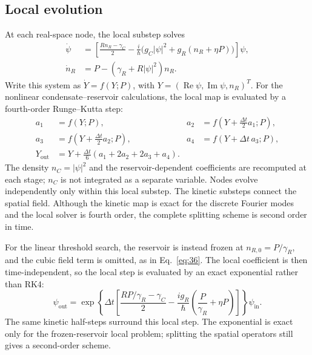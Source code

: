\subsection{Local evolution}\label{sec:B.3}
At each real-space node, the local substep solves
\begin{equation}
\begin{aligned}
\dot\psi&=\left[\frac{Rn_R-\gamma_C}{2}
-\frac{i}{\hbar}\bigl(g_C|\psi|^2+g_R(n_R+\eta P)\bigr)\right]\psi,\\
\dot n_R&=P-(\gamma_R+R|\psi|^2)n_R.
\end{aligned}\label{eq:B.local}
\end{equation}
Write this system as \(\dot Y=f(Y;P)\), with
\(Y=(\operatorname{Re}\psi,\operatorname{Im}\psi,n_R)^T\).
For the nonlinear condensate--reservoir calculations, the local map is evaluated by a fourth-order Runge--Kutta step:
\begin{equation}
\begin{aligned}
a_1&=f(Y;P),& a_2&=f(Y+\tfrac{\Delta t}{2}a_1;P),\\
a_3&=f(Y+\tfrac{\Delta t}{2}a_2;P),& a_4&=f(Y+\Delta t\,a_3;P),\\
Y_{\mathrm{out}}&=Y+\frac{\Delta t}{6}(a_1+2a_2+2a_3+a_4).
\end{aligned}\label{eq:B.rk4}
\end{equation}
The density \(n_C=|\psi|^2\) and the reservoir-dependent coefficients
are recomputed at each stage; \(n_C\) is not integrated as a separate
variable. Nodes evolve independently only within this local substep.
The kinetic substeps connect the spatial field. Although the kinetic map
is exact for the discrete Fourier modes and the local solver is fourth
order, the complete splitting scheme is second order in time.


For the linear threshold search, the reservoir is instead frozen at
\(n_{R,0}=P/\gamma_R\), and the cubic field term is omitted, as in
Eq.~\eqref{eq:36}. The local coefficient is then time-independent,
so the local step is evaluated by an exact exponential rather than RK4:
\begin{equation}\label{eq:B.linear-local}
\psi_{\mathrm{out}}=\exp\!\left\{\Delta t\left[
\frac{RP/\gamma_R-\gamma_C}{2}
-\frac{i g_R}{\hbar}\left(\frac{P}{\gamma_R}+\eta P\right)
\right]\right\}\psi_{\mathrm{in}}.
\end{equation}
The same kinetic half-steps surround this local step. The exponential
is exact only for the frozen-reservoir local problem; splitting the
spatial operators still gives a second-order scheme.

